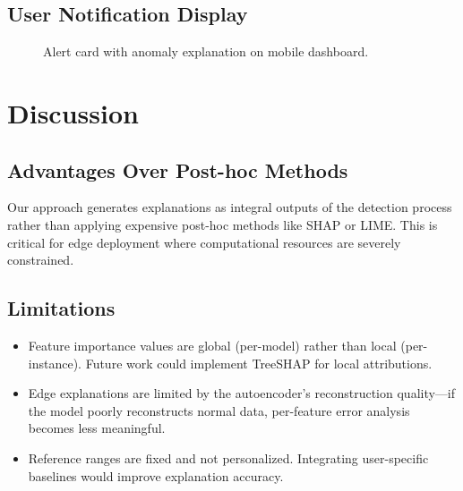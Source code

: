 \documentclass[conference]{IEEEtran}
\begin{document}
\subsection{User Notification Display}

\begin{figure}[H]
\centering
{}
\caption{Alert card with anomaly explanation on mobile dashboard.}
\label{fig:alert_card}
\end{figure}

\section{Discussion}
\subsection{Advantages Over Post-hoc Methods}
Our approach generates explanations as integral outputs of the detection process rather than applying expensive post-hoc methods like SHAP or LIME. This is critical for edge deployment where computational resources are severely constrained.

\subsection{Limitations}
\begin{itemize}
    \item Feature importance values are global (per-model) rather than local (per-instance). Future work could implement TreeSHAP for local attributions.
    \item Edge explanations are limited by the autoencoder's reconstruction quality---if the model poorly reconstructs normal data, per-feature error analysis becomes less meaningful.
    \item Reference ranges are fixed and not personalized. Integrating user-specific baselines would improve explanation accuracy.
\end{itemize}
\end{document}

